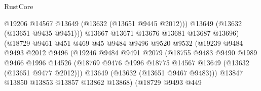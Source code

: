 \begin{lexlean}{RustCore}
\begin{coremodule}
                                        @19206
                                        @14567
                                        @13649
                                        (@13632 (@13651 @9445 @2012)))
                                      @13649
                                      (@13632 (@13651 @9435 @9451)))
                                    @13667
                                    @13671
                                    @13676
                                    @13681
                                    @13687
                                    @13696)
                                  (@18729
                                    @9461
                                    @451
                                    @469
                                    @45
                                    @9484
                                    @9496
                                    @9520
                                    @9532
                                    (@19239
                                      @9484
                                      @9493
                                      @2012
                                      @9496
                                      (@19246
                                        @9484
                                        @9491
                                        @2079
                                        (@18755
                                          @9483
                                          @9490
                                          @1989
                                          @9466
                                          @1996
                                          @14526
                                          (@18769
                                            @9476
                                            @1996
                                            @18775
                                            @14567
                                            @13649
                                            (@13632 (@13651 @9477 @2012)))
                                          @13649
                                          (@13632 (@13651 @9467 @9483)))
                                        @13847
                                        @13850
                                        @13853
                                        @13857
                                        @13862
                                        @13868)
                                      (@18729
                                        @9493
                                        @449

\end{coremodule}
\end{lexlean}
